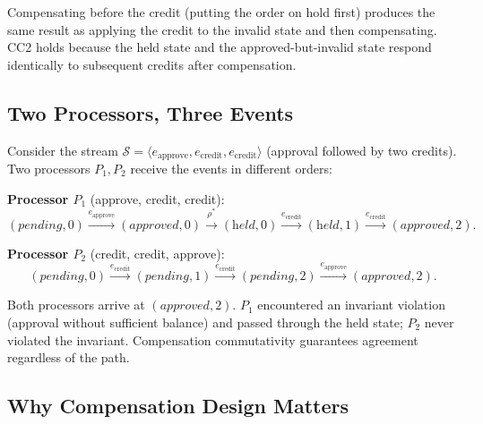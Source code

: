 \documentclass[11pt,a4paper]{article}
\theoremstyle{plain}
\theoremstyle{definition}
\theoremstyle{remark}
\begin{document}
Compensating before the credit (putting the order on hold first) produces the
same result as applying the credit to the invalid state and then compensating.
CC2 holds because the held state and the approved-but-invalid state respond
identically to subsequent credits after compensation.

\subsection{Two Processors, Three Events}

Consider the stream $\mathcal{S} = \langle e_{\mathrm{approve}},
e_{\mathrm{credit}}, e_{\mathrm{credit}} \rangle$ (approval followed by two
credits).  Two processors $P_1, P_2$ receive the events in different orders:

\medskip\noindent
\textbf{Processor $P_1$} (approve, credit, credit):
\[
(\textit{pending}, 0)
\xrightarrow{e_{\mathrm{approve}}} (\textit{approved}, 0)
\xrightarrow{\rho^*} (\textit{held}, 0)
\xrightarrow{e_{\mathrm{credit}}} (\textit{held}, 1)
\xrightarrow{e_{\mathrm{credit}}} (\textit{approved}, 2).
\]

\noindent
\textbf{Processor $P_2$} (credit, credit, approve):
\[
(\textit{pending}, 0)
\xrightarrow{e_{\mathrm{credit}}} (\textit{pending}, 1)
\xrightarrow{e_{\mathrm{credit}}} (\textit{pending}, 2)
\xrightarrow{e_{\mathrm{approve}}} (\textit{approved}, 2).
\]

\noindent Both processors arrive at $(\textit{approved}, 2)$.  $P_1$ encountered
an invariant violation (approval without sufficient balance) and passed
through the held state; $P_2$ never violated the invariant.  Compensation
commutativity guarantees agreement regardless of the path.

\subsection{Why Compensation Design Matters}
\end{document}
